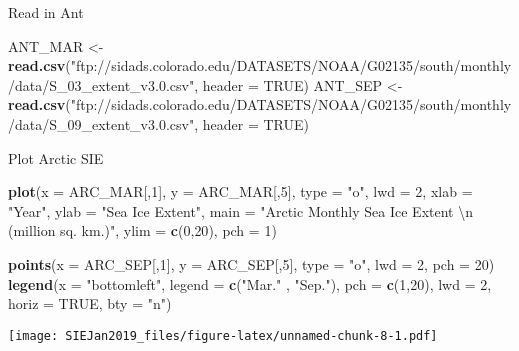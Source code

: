 \documentclass[]{article}
\newenvironment{Shaded}{\begin{snugshade}}{\end{snugshade}}
\newcommand{\KeywordTok}[1]{\textcolor[rgb]{0.13,0.29,0.53}{\textbf{#1}}}
\newcommand{\DataTypeTok}[1]{\textcolor[rgb]{0.13,0.29,0.53}{#1}}
\newcommand{\DecValTok}[1]{\textcolor[rgb]{0.00,0.00,0.81}{#1}}
\newcommand{\CharTok}[1]{\textcolor[rgb]{0.31,0.60,0.02}{#1}}
\newcommand{\StringTok}[1]{\textcolor[rgb]{0.31,0.60,0.02}{#1}}
\newcommand{\OtherTok}[1]{\textcolor[rgb]{0.56,0.35,0.01}{#1}}
\newcommand{\NormalTok}[1]{#1}
\begin{document}
Read in Ant

\begin{Shaded}
\begin{Highlighting}[]
\NormalTok{ANT_MAR <-}\StringTok{ }\KeywordTok{read.csv}\NormalTok{(}\StringTok{"ftp://sidads.colorado.edu/DATASETS/NOAA/G02135/south/monthly/data/S_03_extent_v3.0.csv"}\NormalTok{, }\DataTypeTok{header =} \OtherTok{TRUE}\NormalTok{)}
\NormalTok{ANT_SEP <-}\StringTok{ }\KeywordTok{read.csv}\NormalTok{(}\StringTok{"ftp://sidads.colorado.edu/DATASETS/NOAA/G02135/south/monthly/data/S_09_extent_v3.0.csv"}\NormalTok{, }\DataTypeTok{header =} \OtherTok{TRUE}\NormalTok{)}
\end{Highlighting}
\end{Shaded}

Plot Arctic SIE

\begin{Shaded}
\begin{Highlighting}[]
\KeywordTok{plot}\NormalTok{(}\DataTypeTok{x =}\NormalTok{ ARC_MAR[,}\DecValTok{1}\NormalTok{], }\DataTypeTok{y =}\NormalTok{ ARC_MAR[,}\DecValTok{5}\NormalTok{], }\DataTypeTok{type =} \StringTok{"o"}\NormalTok{, }\DataTypeTok{lwd =} \DecValTok{2}\NormalTok{, }\DataTypeTok{xlab =} \StringTok{"Year"}\NormalTok{, }\DataTypeTok{ylab =} \StringTok{"Sea Ice Extent"}\NormalTok{, }\DataTypeTok{main =} \StringTok{"Arctic Monthly Sea Ice Extent }\CharTok{\textbackslash{}n}\StringTok{ (million sq. km.)"}\NormalTok{, }\DataTypeTok{ylim =} \KeywordTok{c}\NormalTok{(}\DecValTok{0}\NormalTok{,}\DecValTok{20}\NormalTok{), }\DataTypeTok{pch =} \DecValTok{1}\NormalTok{)}

\KeywordTok{points}\NormalTok{(}\DataTypeTok{x =}\NormalTok{ ARC_SEP[,}\DecValTok{1}\NormalTok{], }\DataTypeTok{y =}\NormalTok{ ARC_SEP[,}\DecValTok{5}\NormalTok{], }\DataTypeTok{type =} \StringTok{"o"}\NormalTok{, }\DataTypeTok{lwd =} \DecValTok{2}\NormalTok{, }\DataTypeTok{pch =} \DecValTok{20}\NormalTok{)}
\KeywordTok{legend}\NormalTok{(}\DataTypeTok{x =} \StringTok{"bottomleft"}\NormalTok{, }\DataTypeTok{legend =} \KeywordTok{c}\NormalTok{(}\StringTok{"Mar."}\NormalTok{ , }\StringTok{"Sep."}\NormalTok{), }\DataTypeTok{pch =} \KeywordTok{c}\NormalTok{(}\DecValTok{1}\NormalTok{,}\DecValTok{20}\NormalTok{), }\DataTypeTok{lwd =} \DecValTok{2}\NormalTok{, }\DataTypeTok{horiz =} \OtherTok{TRUE}\NormalTok{, }\DataTypeTok{bty =} \StringTok{"n"}\NormalTok{)}
\end{Highlighting}
\end{Shaded}

\texttt{[image: SIEJan2019\_files/figure-latex/unnamed-chunk-8-1.pdf]}
\end{document}
